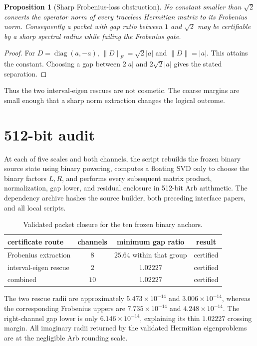 \documentclass[12pt]{article}
\newtheorem{proposition}[theorem]{Proposition}
\begin{document}
\begin{proposition}[Sharp Frobenius-loss obstruction]\label{prop:fro}
No constant smaller than $\sqrt2$ converts the operator norm of every
traceless Hermitian matrix to its Frobenius norm.  Consequently a packet with
gap ratio between $1$ and $\sqrt2$ may be certifiable by a sharp spectral
radius while failing the Frobenius gate.
\end{proposition}
\begin{proof}
For $D=\operatorname{diag}(a,-a)$,
$\|D\|_F=\sqrt2|a|$ and $\|D\|=|a|$.  This attains the constant.  Choosing a
gap between $2|a|$ and $2\sqrt2|a|$ gives the stated separation.
\end{proof}

Thus the two interval-eigen rescues are not cosmetic.  The coarse margins are
small enough that a sharp norm extraction changes the logical outcome.

\section{512-bit audit}
At each of five scales and both channels, the script rebuilds the frozen
binary source state using binary powering, computes a floating SVD only to
choose the binary factors $L,R$, and performs every subsequent matrix product,
normalization, gap lower, and residual enclosure in 512-bit Arb arithmetic.
The dependency archive hashes the source builder, both preceding interface
papers, and all local scripts.

\begin{table}[t]
\centering
\begin{tabular}{lccc}
\toprule
certificate route & channels & minimum gap ratio & result\\
\midrule
Frobenius extraction & $8$ & $25.64$ within that group & certified\\
interval-eigen rescue & $2$ & $1.02227$ & certified\\
combined & $10$ & $1.02227$ & certified\\
\bottomrule
\end{tabular}
\caption{Validated packet closure for the ten frozen binary anchors.}
\label{tab:audit}
\end{table}

The two rescue radii are approximately $5.473\times10^{-14}$ and
$3.006\times10^{-14}$, whereas the corresponding Frobenius uppers are
$7.735\times10^{-14}$ and $4.248\times10^{-14}$.  The right-channel gap lower
is only $6.146\times10^{-14}$, explaining its thin $1.02227$ crossing margin.
All imaginary radii returned by the validated Hermitian eigenproblems are at
the negligible Arb rounding scale.
\end{document}
